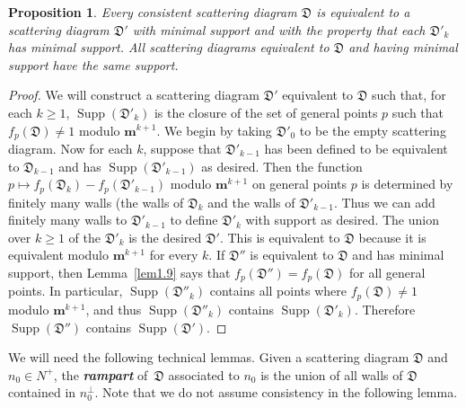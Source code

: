 \documentclass{amsart}
\newtheorem{prop}[proposition]{Proposition}
\theoremstyle{definition}
\theoremstyle{remark}
\numberwithin{equation}{section}
\newcommand{\newword}[1]{\textbf{\emph{#1}}}
\newcommand{\D}{{\mathfrak D}}
\newcommand{\0}{{\mathbf{0}}}
\newcommand{\m}{\mathbf{m}}
\newcommand{\Supp}{\operatorname{Supp}}
\renewcommand{\d}{{\mathfrak d}}
\begin{document}
\begin{prop}\label{min sup}
Every consistent scattering diagram $\D$ is equivalent to a scattering diagram $\D'$ with minimal support and with the property that each $\D'_k$ has minimal support.
All scattering diagrams equivalent to $\D$ and having minimal support have the same support.
\end{prop}
\begin{proof}  
We will construct a scattering diagram $\D'$ equivalent to $\D$ such that, for each $k\ge1$, $\Supp(\D'_k)$ is the closure of the set of general points $p$ such that $f_p(\D)\neq1$ modulo $\m^{k+1}$.
We begin by taking $\D'_0$ to be the empty scattering diagram.
Now for each $k$, suppose that $\D'_{k-1}$ has been defined to be equivalent to $\D_{k-1}$ and has $\Supp(\D'_{k-1})$ as desired.
Then the function $p\mapsto f_p(\D_k)-f_p(\D'_{k-1})$ modulo $\m^{k+1}$ on general points $p$ is determined by finitely many walls (the walls of $\D_k$ and the walls of $\D'_{k-1}$.
Thus we can add finitely many walls to $\D'_{k-1}$ to define $\D'_k$ with support as desired.
The union over $k\ge1$ of the $\D'_k$ is the desired $\D'$.
This is equivalent to $\D$ because it is equivalent modulo $\m^{k+1}$ for every $k$.
If $\D''$ is equivalent to $\D$ and has minimal support, then Lemma~\ref{lem1.9} says that $f_p(\D'')=f_p(\D)$ for all general points.
In particular, $\Supp(\D''_k)$ contains all points where $f_p(\D)\neq1$ modulo $\m^{k+1}$, and thus $\Supp(\D''_k)$ contains $\Supp(\D'_k)$.
Therefore $\Supp(\D'')$ contains $\Supp(\D')$.
\end{proof}

%
We will need the following technical lemmas.
Given a scattering diagram $\D$ and $n_0\in N^+$, the \newword{rampart} of~$\D$ associated to $n_0$ is the union of all walls of $\D$ contained in $n_0^\perp$.
Note that we do not assume consistency in the following lemma.
\end{document}
